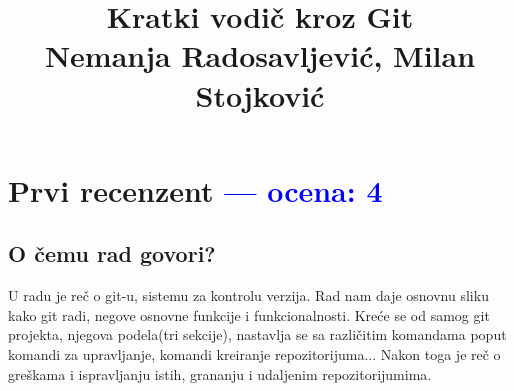 \documentclass[a4paper]{report}
\newcommand{\odgovor}[1]{\textcolor{blue}{#1}}
\begin{document}
\title{Kratki vodič kroz Git\\ \small{Nemanja Radosavljević, Milan Stojković}}

\maketitle
\tableofcontents


\chapter{Prvi recenzent \odgovor{--- ocena: 4} }

\section{O čemu rad govori?}
U radu je reč o git-u, sistemu za kontrolu verzija. Rad nam daje osnovnu sliku kako git radi, negove osnovne funkcije i funkcionalnosti. Kreće se od samog git projekta, njegova podela(tri sekcije),  nastavlja se sa različitim komandama poput komandi za upravljanje, komandi kreiranje repozitorijuma... Nakon toga je reč o greškama i ispravljanju istih, grananju i udaljenim repozitorijumima.
\end{document}
